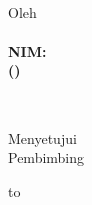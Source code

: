 \begin{center}
	\textbf{\large{\MakeUppercase{\judul}}}\\

	\addvspace{3cm}

	Oleh\\
	\textbf{
		\myname\\
		NIM: \mysid\\
		(\mydept)\\
	}

	\bigskip
	\itb\\

	\addvspace{3cm}

	Menyetujui\\
	Pembimbing\\
	\bigskip

	\vfill

	\makebox[6cm][c]{
		\hrulefill
	}
	\hbox to \hsize{%
		\strut\hfil%
		(\myadvisorname)%
		\hfil%
	}
\end{center}
\vfill
